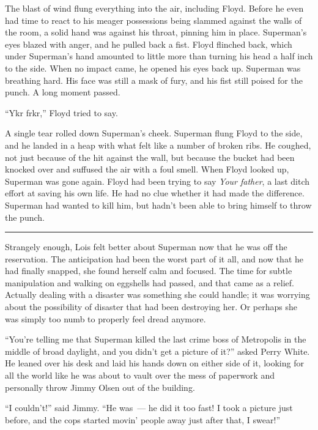 \documentclass[ebook,12pt]{memoir}
\begin{document}
The blast of wind flung everything into the air, including Floyd. Before
he even had time to react to his meager possessions being slammed
against the walls of the room, a solid hand was against his throat,
pinning him in place. Superman's eyes blazed with anger, and he pulled
back a fist. Floyd flinched back, which under Superman's hand amounted
to little more than turning his head a half inch to the side. When no
impact came, he opened his eyes back up. Superman was breathing hard.
His face was still a mask of fury, and his fist still poised for the
punch. A long moment passed.

``Ykr frkr,'' Floyd tried to say.

A single tear rolled down Superman's cheek. Superman flung Floyd to the
side, and he landed in a heap with what felt like a number of broken
ribs. He coughed, not just because of the hit against the wall, but
because the bucket had been knocked over and suffused the air with a
foul smell. When Floyd looked up, Superman was gone again. Floyd had
been trying to say \emph{Your father}, a last ditch effort at saving his
own life. He had no clue whether it had made the difference. Superman
had wanted to kill him, but hadn't been able to bring himself to throw
the punch.

\begin{center}\rule{0.5\linewidth}{0.5pt}\end{center}

Strangely enough, Lois felt better about Superman now that he was off
the reservation. The anticipation had been the worst part of it all, and
now that he had finally snapped, she found herself calm and focused. The
time for subtle manipulation and walking on eggshells had passed, and
that came as a relief. Actually dealing with a disaster was something
she could handle; it was worrying about the possibility of disaster that
had been destroying her. Or perhaps she was simply too numb to properly
feel dread anymore.

``You're telling me that Superman killed the last crime boss of
Metropolis in the middle of broad daylight, and you didn't get a picture
of it?'' asked Perry White. He leaned over his desk and laid his hands
down on either side of it, looking for all the world like he was about
to vault over the mess of paperwork and personally throw Jimmy Olsen out
of the building.

``I couldn't!'' said Jimmy. ``He was~--- he did it too fast! I took a
picture just before, and the cops started movin' people away just after
that, I swear!''
\end{document}

